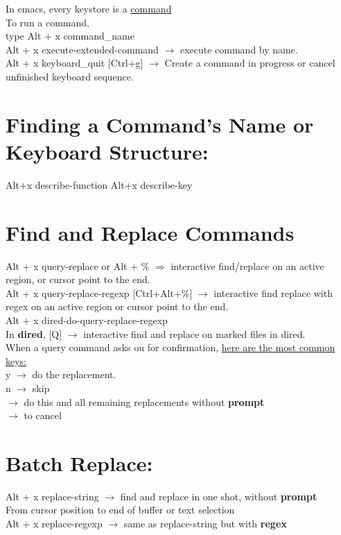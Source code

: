 \documentclass{article}
\begin{document}
In emacs, every keystore is a \underline{command}
\\
To run a command,
\\
type Alt + x \<command\_name\>
\\
Alt + x execute-extended-command $\rightarrow$ execute command by name.
\\
Alt + x keyboard\_quit [Ctrl+g] $\rightarrow$ Create a command in progress or cancel unfinished keyboard sequence.
\\
\section{Finding a Command's Name or Keyboard Structure:}
Alt+x \<describe-function\>
Alt+x \<describe-key\>
\\
\section{Find and Replace Commands}
Alt + x query-replace or Alt + \% $\Rightarrow$ interactive find/replace on an active region, or cursor point to the end.
\\
Alt + x query-replace-regexp [Ctrl+Alt+\%] $\rightarrow$ interactive find replace with regex on an active region or cursor point to the end.
\\
Alt + x dired-do-query-replace-regexp
\\
In \textbf{dired}, [Q] $\rightarrow$ interactive find and replace on marked files in dired.
\\
When a query command asks ou for confirmation, \underline{here are the most common keys:}
\\
y $\rightarrow$ do the replacement.
\\
n $\rightarrow$ skip
\\
\! $\rightarrow$ do this and all remaining replacements without \textbf{prompt}
\\
[Ctrl+g] $\rightarrow$ to cancel
\\
\section{Batch Replace:}
Alt + x replace-string $\rightarrow$ find and replace in one shot, without \textbf{prompt}
\\
From cursor position to end of buffer or text selection
\\
Alt + x replace-regexp $\rightarrow$ same as replace-string but with \textbf{regex}
\end{document}
